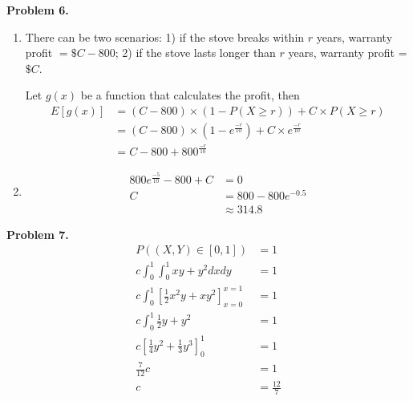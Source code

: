 \documentclass{article}
\begin{document}
\textbf{Problem 6.}
\begin{enumerate}[label={(\alph*)}]
    \item There can be two scenarios: 1) if the stove breaks within $r$ years, warranty profit $ = \$C-800$; 2) if the stove lasts longer than $r$ years, warranty profit = $\$C$.
    
    Let $g(x)$ be a function that calculates the profit, then 
    \begin{align}
        E[g(x)] & = (C-800) \times \left(1-P(X \ge r)\right)+C\times P(X\ge r) \\
        & = (C-800) \times (1 - e^{\frac{-r}{10}})+C\times e^{\frac{-r}{10}} \\
        & = C-800+800^{\frac{-r}{10}}
    \end{align}

    \item 
    \begin{align}
        800e^{\frac{-5}{10}}-800+C & = 0 \\
        C & = 800 - 800e^{-0.5} \\
        & \approx 314.8
    \end{align}
\end{enumerate}
\bigbreak

\textbf{Problem 7.}
\begin{align}
    P((X,Y)\in [0,1])&=1 \\
    c\int_{0}^{1}\int_{0}^{1}xy+y^2dxdy & = 1 \\
    c\int_{0}^{1}\left[\frac{1}{2}x^2y+xy^2\right]_{x=0}^{x=1} & = 1 \\
    c\int_{0}^{1}\frac{1}{2}y+y^2& = 1 \\
    c\left[\frac{1}{4}y^2+\frac{1}{3}y^3\right]_0^1 & = 1 \\
    \frac{7}{12}c & = 1 \\
    c & = \frac{12}{7}
\end{align}
\end{document}
